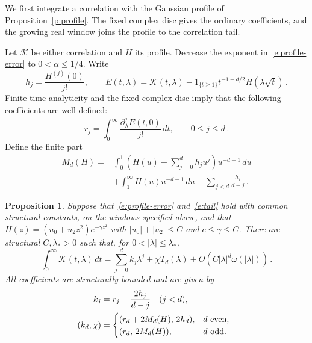 \documentclass[11pt]{amsart}
\newtheorem{proposition}{Proposition}[section]
\theoremstyle{definition}
\theoremstyle{remark}
\numberwithin{equation}{section}
\newcommand{\dd}{\,d}
\begin{document}
We first integrate a correlation with the Gaussian profile of Proposition~\ref{p:profile}. The fixed complex disc gives the ordinary coefficients, and the growing real window joins the profile to the correlation tail.

Let $\mathcal K$ be either correlation and $H$ its profile. Decrease the exponent in~\eqref{e:profile-error} to $0<\alpha\leq1/4$. Write
\begin{equation*}
 h_j=\frac{H^{(j)}(0)}{j!},\qquad
 E(t,\lambda)=\mathcal K(t,\lambda)
                -1_{\{t\geq1\}}t^{-1-d/2}H(\lambda\sqrt t)\, .
\end{equation*}
Finite time analyticity and the fixed complex disc imply that the following coefficients are well defined:
\begin{equation}\label{e:rj}
 r_j=\int_0^\infty\frac{\partial_\lambda^jE(t,0)}{j!}\dd t,
 \qquad 0\leq j\leq d\, .
\end{equation}
Define the finite part
\begin{equation}\label{e:finite-part}
 \begin{split}
 M_d(H)={}&\int_0^1
 \left(H(u)-\sum_{j=0}^dh_ju^j\right)u^{-d-1}\dd u\\
 &+\int_1^\infty H(u)u^{-d-1}\dd u
       -\sum_{j<d}\frac{h_j}{d-j}\, .
 \end{split}
\end{equation}

\begin{proposition}\label{p:integration}
Suppose that~\eqref{e:profile-error} and~\eqref{e:tail} hold with common structural constants, on the windows specified above, and that $H(z)=(u_0+u_2z^2)e^{-\gamma z^2}$ with $|u_0|+|u_2|\leq C$ and $c\leq\gamma\leq C$. There are structural $C,\lambda_*>0$ such that, for $0<|\lambda|\leq\lambda_*$,
\begin{equation}\label{e:kernel-expansion}
 \int_0^\infty\mathcal K(t,\lambda)\dd t
 =\sum_{j=0}^d k_j\lambda^j+\chi T_d(\lambda)
                +O(C|\lambda|^d\omega(|\lambda|))\, .
\end{equation}
All coefficients are structurally bounded and are given by
\begin{align}\label{e:kernel-coeff}
 k_j&=r_j+\frac{2h_j}{d-j}\quad(j<d),\notag\\
 (k_d,\chi)&=
 \begin{cases}
 (r_d+2M_d(H),\,2h_d),&d\text{ even},\\
 (r_d,\,2M_d(H)),&d\text{ odd}.
 \end{cases}\, .
\end{align}
\end{proposition}
\end{document}

